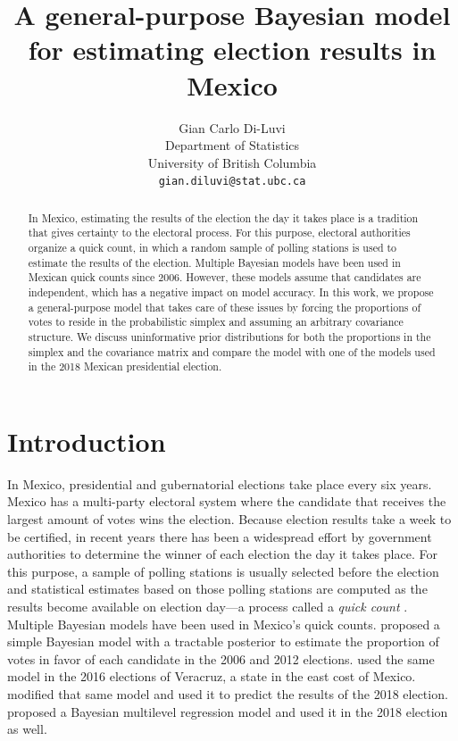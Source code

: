 \documentclass{article}
\title{A general-purpose Bayesian model for estimating election results in Mexico}
\author{%
  Gian Carlo Di-Luvi \\
  Department of Statistics\\
  University of British Columbia \\
  \texttt{gian.diluvi@stat.ubc.ca}
}
\begin{document}
\maketitle

\begin{abstract}
  In Mexico, estimating the results of the election the day it takes place is a tradition that gives certainty to the electoral process. For this purpose, electoral authorities organize a quick count, in which a random sample of polling stations is used to estimate the results of the election. Multiple Bayesian models have been used in Mexican quick counts since 2006. However, these models assume that candidates are independent, which has a negative impact on model accuracy. In this work, we propose a general-purpose model that takes care of these issues by forcing the proportions of votes to reside in the probabilistic simplex and assuming an arbitrary covariance structure. We discuss uninformative prior distributions for both the proportions in the simplex and the covariance matrix and compare the model with one of the models used in the 2018 Mexican presidential election.
\end{abstract}



\section{Introduction} \label{sec:intro}


In Mexico, presidential and gubernatorial elections take place every six years. Mexico has a multi-party electoral system where the candidate that receives the largest amount of votes wins the election. Because election results take a week to be certified, in recent years there has been a widespread effort by government authorities to determine the winner of each election the day it takes place. For this purpose, a sample of polling stations is usually selected before the election and statistical estimates based on those polling stations are computed as the results become available on election day---a process called a \textit{quick count} \citep{carrera2019}.
\\



Multiple Bayesian models have been used in Mexico's quick counts. \citet{mendoza-nieto2016} proposed a simple Bayesian model with a tractable posterior to estimate the proportion of votes in favor of each candidate in the 2006 and 2012 elections. \citet{cerrillo2019} used the same model in the 2016 elections of Veracruz, a state in the east cost of Mexico. \citet{diluvi2018} modified that same model and used it to predict the results of the 2018 election. \citet{anzarut2018} proposed a Bayesian multilevel regression model and used it in the 2018 election as well.
\\
\end{document}
